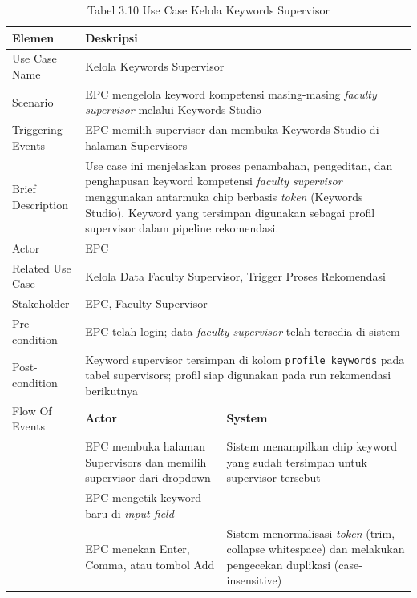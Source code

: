 \begin{longtable}{|p{3.5cm}|p{4.5cm}|p{5cm}|}
\caption{Tabel 3.10 Use Case Kelola Keywords Supervisor} \label{table:tab3.10} \\
\hline
\textbf{Elemen} & \multicolumn{2}{p{\ucdeskcol}|}{\textbf{Deskripsi}} \\
\hline
\endfirsthead
\endhead
\hline
\endfoot
Use Case Name & \multicolumn{2}{p{\ucdeskcol}|}{Kelola Keywords Supervisor} \\
\hline
Scenario & \multicolumn{2}{p{\ucdeskcol}|}{EPC mengelola keyword kompetensi masing-masing \textit{faculty supervisor} melalui Keywords Studio} \\
\hline
Triggering Events & \multicolumn{2}{p{\ucdeskcol}|}{EPC memilih supervisor dan membuka Keywords Studio di halaman Supervisors} \\
\hline
Brief Description & \multicolumn{2}{p{\ucdeskcol}|}{Use case ini menjelaskan proses penambahan, pengeditan, dan penghapusan keyword kompetensi \textit{faculty supervisor} menggunakan antarmuka chip berbasis \textit{token} (Keywords Studio). Keyword yang tersimpan digunakan sebagai profil supervisor dalam pipeline rekomendasi.} \\
\hline
Actor & \multicolumn{2}{p{\ucdeskcol}|}{EPC} \\
\hline
Related Use Case & \multicolumn{2}{p{\ucdeskcol}|}{Kelola Data Faculty Supervisor, Trigger Proses Rekomendasi} \\
\hline
Stakeholder & \multicolumn{2}{p{\ucdeskcol}|}{EPC, Faculty Supervisor} \\
\hline
Pre-condition & \multicolumn{2}{p{\ucdeskcol}|}{EPC telah login; data \textit{faculty supervisor} telah tersedia di sistem} \\
\hline
Post-condition & \multicolumn{2}{p{\ucdeskcol}|}{Keyword supervisor tersimpan di kolom \texttt{profile\_keywords} pada tabel supervisors; profil siap digunakan pada run rekomendasi berikutnya} \\
\hline
Flow Of Events & \textbf{Actor} & \textbf{System} \\
\hline
 & EPC membuka halaman Supervisors dan memilih supervisor dari dropdown & Sistem menampilkan chip keyword yang sudah tersimpan untuk supervisor tersebut \\
\hline
 & EPC mengetik keyword baru di \textit{input field} & \\
\hline
 & EPC menekan Enter, Comma, atau tombol Add & Sistem menormalisasi \textit{token} (trim, collapse whitespace) dan melakukan pengecekan duplikasi (case-insensitive) \\

\end{longtable}
